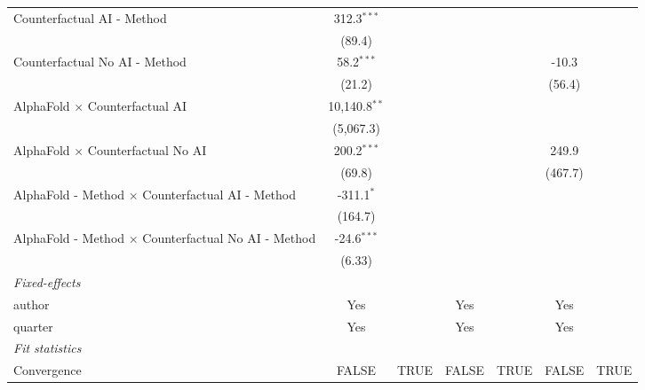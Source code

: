 \begin{tabular}{lcccccc}
   Counterfactual AI - Method                                 & 312.3$^{***}$   &      &         &      &         &   \\   
                                                              & (89.4)          &      &         &      &         &   \\   
   Counterfactual No AI - Method                              & 58.2$^{***}$    &      &         &      & -10.3   &   \\   
                                                              & (21.2)          &      &         &      & (56.4)  &   \\   
   AlphaFold $\times$ Counterfactual AI                       & 10,140.8$^{**}$ &      &         &      &         &   \\   
                                                              & (5,067.3)       &      &         &      &         &   \\   
   AlphaFold $\times$ Counterfactual No AI                    & 200.2$^{***}$   &      &         &      & 249.9   &   \\   
                                                              & (69.8)          &      &         &      & (467.7) &   \\   
   AlphaFold - Method $\times$ Counterfactual AI - Method     & -311.1$^{*}$    &      &         &      &         &   \\   
                                                              & (164.7)         &      &         &      &         &   \\   
   AlphaFold - Method $\times$ Counterfactual No AI - Method  & -24.6$^{***}$   &      &         &      &         &   \\   
                                                              & (6.33)          &      &         &      &         &   \\   
   \midrule
   \emph{Fixed-effects}\\
   author                                                     & Yes             &      & Yes     &      & Yes     & \\  
   quarter                                                    & Yes             &      & Yes     &      & Yes     & \\  
   \midrule
   \emph{Fit statistics}\\
   Convergence                                                &FALSE            & TRUE & FALSE   & TRUE & FALSE   & TRUE\\  

\end{tabular}
